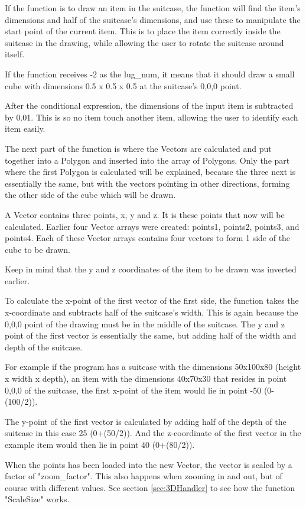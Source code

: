 If the function is to draw an item in the suitcase, the function will find the item's dimensions and half of the suitcase's dimensions, and use these to manipulate the start point of the current item. This is to place the item correctly inside the suitcase in the drawing, while allowing the user to rotate the suitcase around itself. 

If the function receives -2 as the lug\_num, it means that it should draw a small cube with dimensions 0.5 x 0.5 x 0.5 at the suitcase's 0,0,0 point.

After the conditional expression, the dimensions of the input item is subtracted by 0.01. This is so no item touch another item, allowing the user to identify each item easily. 

The next part of the function is where the Vectors are calculated and put together into a Polygon and inserted into the array of Polygons. Only the part where the first Polygon is calculated will be explained, because the three next is essentially the same, but with the vectors pointing in other directions, forming the other side of the cube which will be drawn.

A Vector contains three points, x, y and z. It is these points that now will be calculated. Earlier four Vector arrays were created: points1, points2, points3, and points4. Each of these Vector arrays contains four vectors to form 1 side of the cube to be drawn. 

Keep in mind that the y and z coordinates of the item to be drawn was inverted earlier. 

To calculate the x-point of the first vector of the first side, the function takes the x-coordinate and subtracts half of the suitcase's width. This is again because the 0,0,0 point of the drawing must be in the middle of the suitcase. The y and z point of the first vector is essentially the same, but adding half of the width and depth of the suitcase.

For example if the program has a suitcase with the dimensions 50x100x80 (height x width x depth), an item with the dimensions 40x70x30 that resides in point 0,0,0 of the suitcase, the first x-point of the item would lie in point -50 (0-(100/2)). 

The y-point of the first vector is calculated by adding half of the depth of the suitcase in this case 25 (0+(50/2)). And the z-coordinate of the first vector in the example item would then lie in point 40 (0+(80/2)).

When the points has been loaded into the new Vector, the vector is scaled by a factor of "zoom\_factor". This also happens when zooming in and out, but of course with different values. See section \ref{sec:3DHandler} to see how the function "ScaleSize" works. 

